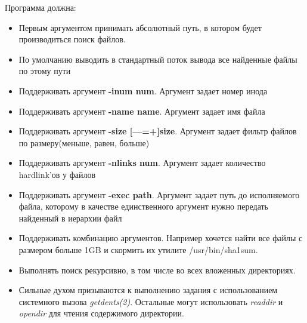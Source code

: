 \documentclass[../../lectures.tex]{subfiles}
\begin{document}
Программа должна:
\begin{itemize}
    \item Первым аргументом принимать абсолютный путь, в котором будет производиться поиск файлов.
    \item По умолчанию выводить в стандартный поток вывода все найденные файлы по этому пути
    \item Поддерживать аргумент \textbf{-inum num}. Аргумент задает номер инода
    \item Поддерживать аргумент \textbf{-name name}. Аргумент задает имя файла
    \item Поддерживать аргумент \textbf{-size [---=+]size}. Аргумент задает фильтр файлов по размеру(меньше, равен, больше)
    \item Поддерживать аргумент \textbf{-nlinks num}. Аргумент задает количество hardlink'ов у файлов
    \item Поддерживать аргумент \textbf{-exec path}. Аргумент задает путь до исполняемого файла, которому в качестве единственного аргумент нужно передать найденный в иерархии файл
    \item Поддерживать комбинацию аргументов. Например хочется найти все файлы с размером больше 1GB и скормить их утилите /usr/bin/sha1sum.
    \item Выполнять поиск рекурсивно, в том числе во всех вложенных директориях.
    \item Сильные духом призываются к выполнению задания с использованием системного вызова 
        \emph{getdents(2)}. Остальные могут использовать \emph{readdir} и \emph{opendir} для чтения содержимого директории.
\end{itemize}
\end{document}
